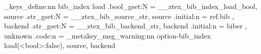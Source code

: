 \ztex_keys_define:nn { bib_index }{
  load                .bool_gset:N  = \g__ztex_bib_index_load_bool,
  source              .str_gset:N   = \g__ztex_bib_source_str,
  source              .initial:n    = { ref.bib },
  backend             .str_gset:N   = \g__ztex_bib_backend_str,
  backend             .initial:n    = { biber },
  unknown             .code:n       = { 
    \ztex_metakey_msg_warning:nn {option-bib_index}
      {load(<bool>:false), source, backend} 
  }
}
